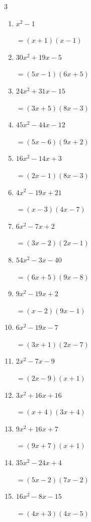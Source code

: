 \begin{multicols}{3}
\begin{enumerate}
        $=(x+3)(9x-1)$

  \item $x^{2}-1$

        $=(x+1)(x-1)$

  \item $30x^{2}+19x-5$

        $=(5x-1)(6x+5)$

  \item $24x^{2}+31x-15$

        $=(3x+5)(8x-3)$

  \item $45x^{2}-44x-12$

        $=(5x-6)(9x+2)$

  \item $16x^{2}-14x+3$

        $=(2x-1)(8x-3)$

\columnbreak %

  \item $4x^{2}-19x+21$

        $=(x-3)(4x-7)$

  \item $6x^{2}-7x+2$

        $=(3x-2)(2x-1)$

  \item $54x^{2}-3x-40$

        $=(6x+5)(9x-8)$

  \item $9x^{2}-19x+2$

        $=(x-2)(9x-1)$

  \item $6x^{2}-19x-7$

        $=(3x+1)(2x-7)$

  \item $2x^{2}-7x-9$

        $=(2x-9)(x+1)$

  \item $3x^{2}+16x+16$

        $=(x+4)(3x+4)$

  \item $9x^{2}+16x+7$

        $=(9x+7)(x+1)$

  \item $35x^{2}-24x+4$

        $=(5x-2)(7x-2)$

  \item $16x^{2}-8x-15$

        $=(4x+3)(4x-5)$


\end{enumerate}
\end{multicols}
